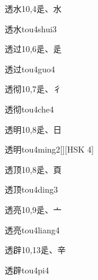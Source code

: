 \begin{Entry}{透水}{10,4}{⾡、⽔}
  \begin{Phonetics}{透水}{tou4shui3}
  \end{Phonetics}
\end{Entry}

\begin{Entry}{透过}{10,6}{⾡、⾡}
  \begin{Phonetics}{透过}{tou4guo4}
  \end{Phonetics}
\end{Entry}

\begin{Entry}{透彻}{10,7}{⾡、⼻}
  \begin{Phonetics}{透彻}{tou4che4}
  \end{Phonetics}
\end{Entry}

\begin{Entry}{透明}{10,8}{⾡、⽇}
  \begin{Phonetics}{透明}{tou4ming2}[][HSK 4]
  \end{Phonetics}
\end{Entry}

\begin{Entry}{透顶}{10,8}{⾡、⾴}
  \begin{Phonetics}{透顶}{tou4ding3}
  \end{Phonetics}
\end{Entry}

\begin{Entry}{透亮}{10,9}{⾡、⼇}
  \begin{Phonetics}{透亮}{tou4liang4}
  \end{Phonetics}
\end{Entry}

\begin{Entry}{透辟}{10,13}{⾡、⾟}
  \begin{Phonetics}{透辟}{tou4pi4}
  \end{Phonetics}
\end{Entry}

